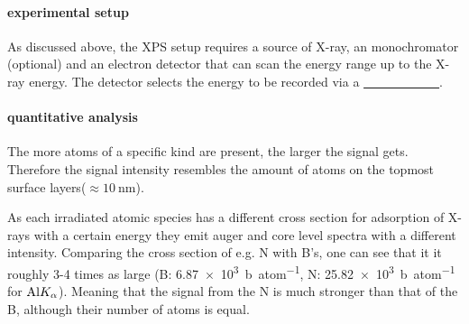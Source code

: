 \paragraph{experimental setup}
As discussed above, the XPS setup requires a source of X-ray, an monochromator (optional) and an electron detector that can scan the energy range up to the X-ray energy. The detector selects the energy to be recorded via a \underline{\ \ \ \ \ \ \ \ \ \ \ \ }.
\paragraph{quantitative analysis}
The more atoms of a specific kind are present, the larger the signal gets. Therefore the signal intensity resembles the amount of atoms on the topmost surface layers($\approx \SI{10}{\nm}$).

As each irradiated atomic species has a different cross section for adsorption of X-rays with a certain energy they emit auger and core level spectra with a different intensity. Comparing the cross section of e.g. N with B's, one can see that it it roughly 3-4 times as large (B: \SI{6,87e3}{\barn\per atom}, N: \SI{25,82e3}{\barn\per atom} for $\textnormal{Al} K_{\alpha}$)\cite{henke_x-ray_1993}. Meaning that the signal from the N is much stronger than that of the B, although their number of atoms is equal.

